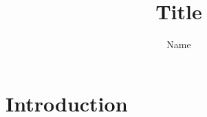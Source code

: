 \documentclass{article}
\title{Title}
\author{Name}
\begin{document}
\maketitle

\section{Introduction}
\end{document}
